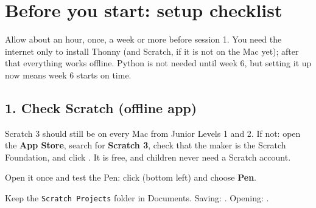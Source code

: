 \documentclass[track=junior,level=3,teacher]{kidscode}
\begin{document}
\section{Before you start: setup checklist}
Allow about an hour, once, a week or more before session 1. You need the internet only to install
Thonny (and Scratch, if it is not on the Mac yet); after that everything works offline. Python is not
needed until week 6, but setting it up now means week 6 starts on time.

\subsection{1. Check Scratch (offline app)}
\begin{checklist}
  \item Scratch 3 should still be on every Mac from Junior Levels 1 and 2. If not: open the
        \textbf{App Store}, search for \textbf{Scratch 3}, check that the maker is the Scratch
        Foundation, and click . It is free, and children never need a Scratch account.
  \item Open it once and test the Pen: click  (bottom left) and choose \textbf{Pen}.
  \item Keep the \texttt{Scratch Projects} folder in Documents. Saving: .
        Opening: .
\end{checklist}
\end{document}

